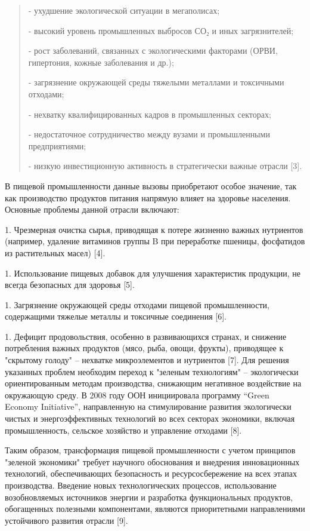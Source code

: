 \begin{quote}
- ухудшение экологической ситуации в мегаполисах;

- высокий уровень промышленных выбросов СО₂ и иных загрязнителей;

- рост заболеваний, связанных с экологическими факторами (ОРВИ,
гипертония, кожные заболевания и др.);

- загрязнение окружающей среды тяжелыми металлами и токсичными отходами;

- нехватку квалифицированных кадров в промышленных секторах;

- недостаточное сотрудничество между вузами и промышленными
предприятиями;

- низкую инвестиционную активность в стратегически важные отрасли
{[}3{]}.
\end{quote}

В пищевой промышленности данные вызовы приобретают особое значение, так
как производство продуктов питания напрямую влияет на здоровье
населения. Основные проблемы данной отрасли включают:


1. Чрезмерная очистка сырья, приводящая к потере жизненно важных
нутриентов (например, удаление витаминов группы B при переработке
пшеницы, фосфатидов из растительных масел) {[}4{]}.

1. Использование пищевых добавок для улучшения характеристик продукции,
не всегда безопасных для здоровья {[}5{]}.

1. Загрязнение окружающей среды отходами пищевой промышленности,
содержащими тяжелые металлы и токсичные соединения {[}6{]}.

1. Дефицит продовольствия, особенно в развивающихся странах, и снижение
потребления важных продуктов (мясо, рыба, овощи, фрукты), приводящее к
"скрытому голоду" -- нехватке микроэлементов и нутриентов {[}7{]}.
Для решения указанных проблем необходим переход к "зеленым технологиям"
-- экологически ориентированным методам производства, снижающим
негативное воздействие на окружающую среду. В 2008 году ООН инициировала
программу ``Green Economy Initiative'', направленную на стимулирование
развития экологически чистых и энергоэффективных технологий во всех
секторах экономики, включая промышленность, сельское хозяйство и
управление отходами {[}8{]}.

Таким образом, трансформация пищевой промышленности с учетом принципов
"зеленой экономики" требует научного обоснования и внедрения
инновационных технологий, обеспечивающих безопасность и
ресурсосбережение на всех этапах производства. Введение новых
технологических процессов, использование возобновляемых источников
энергии и разработка функциональных продуктов, обогащенных полезными
компонентами, являются приоритетными направлениями устойчивого развития
отрасли {[}9{]}.

